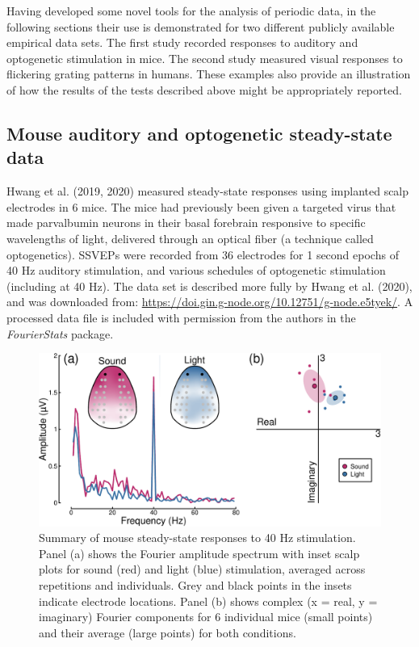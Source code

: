 \documentclass[]{article}
\begin{document}
Having developed some novel tools for the analysis of periodic data, in the following sections their use is demonstrated for two different publicly available empirical data sets. The first study recorded responses to auditory and optogenetic stimulation in mice. The second study measured visual responses to flickering grating patterns in humans. These examples also provide an illustration of how the results of the tests described above might be appropriately reported.

\hypertarget{mouse-auditory-and-optogenetic-steady-state-data}{%
\subsection{Mouse auditory and optogenetic steady-state data}\label{mouse-auditory-and-optogenetic-steady-state-data}}

Hwang et al. (2019, 2020) measured steady-state responses using implanted scalp electrodes in 6 mice. The mice had previously been given a targeted virus that made parvalbumin neurons in their basal forebrain responsive to specific wavelengths of light, delivered through an optical fiber (a technique called optogenetics). SSVEPs were recorded from 36 electrodes for 1 second epochs of 40 Hz auditory stimulation, and various schedules of optogenetic stimulation (including at 40 Hz). The data set is described more fully by Hwang et al. (2020), and was downloaded from: \url{https://doi.gin.g-node.org/10.12751/g-node.e5tyek/}. A processed data file is included with permission from the authors in the \emph{FourierStats} package.

\begin{figure}

{\centering \includegraphics{manuscript_files/figure-latex/mousedata-1} 

}

\caption{Summary of mouse steady-state responses to 40 Hz stimulation. Panel (a) shows the Fourier amplitude spectrum with inset scalp plots for sound (red) and light (blue) stimulation, averaged across repetitions and individuals. Grey and black points in the insets indicate electrode locations. Panel (b) shows complex (x = real, y = imaginary) Fourier components for 6 individual mice (small points) and their average (large points) for both conditions.}\label{fig:mousedata}
\end{figure}
\end{document}
